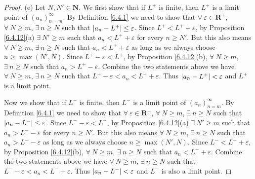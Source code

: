 \begin{proof}{(e)}
    Let \(N, N' \in \mathbf{N}\).
    We first show that if \(L^+\) is finite, then \(L^+\) is a limit point of \((a_n)_{n = m}^\infty\).
    By Definition \ref{6.4.1} we need to show that \(\forall\ \varepsilon \in \mathbf{R}^+\), \(\forall\ N \geq m\), \(\exists\ n \geq N\) such that \(\abs*{a_n - L^+} \leq \varepsilon\).
    Since \(L^+ < L^+ + \varepsilon\), by Proposition \ref{6.4.12}(a) \(\exists\ N' \geq m\) such that \(a_n < L^+ + \varepsilon\) for every \(n \geq N'\).
    But this also means \(\forall\ N \geq m\), \(\exists\ n \geq N\) such that \(a_n < L^+ + \varepsilon\) as long as we always choose \(n \geq \max(N', N)\).
    Since \(L^+ - \varepsilon < L^+\), by Proposition \ref{6.4.12}(b), \(\forall\ N \geq m\), \(\exists\ n \geq N\) such that \(a_n > L^+ - \varepsilon\).
    Combine the two statements above we have \(\forall\ N \geq m\), \(\exists\ n \geq N\) such that \(L^+ - \varepsilon < a_n < L^+ + \varepsilon\).
    Thus \(\abs*{a_n - L^+} < \varepsilon\) and \(L^+\) is a limit point.

    Now we show that if \(L^-\) is finite, then \(L^-\) is a limit point of \((a_n)_{n = m}^\infty\).
    By Definition \ref{6.4.1} we need to show that \(\forall\ \varepsilon \in \mathbf{R}^+\), \(\forall\ N \geq m\), \(\exists\ n \geq N\) such that \(\abs*{a_n - L^-} \leq \varepsilon\).
    Since \(L^- - \varepsilon < L^-\), by Proposition \ref{6.4.12}(a) \(\exists\ N' \geq m\) such that \(a_n > L^- - \varepsilon\) for every \(n \geq N'\).
    But this also means \(\forall\ N \geq m\), \(\exists\ n \geq N\) such that \(a_n > L^- - \varepsilon\) as long as we always choose \(n \geq \max(N', N)\).
    Since \(L^- < L^- + \varepsilon\), by Proposition \ref{6.4.12}(b), \(\forall\ N \geq m\), \(\exists\ n \geq N\) such that \(a_n < L^- + \varepsilon\).
    Combine the two statements above we have \(\forall\ N \geq m\), \(\exists\ n \geq N\) such that \(L^- - \varepsilon < a_n < L^- + \varepsilon\).
    Thus \(\abs*{a_n - L^-} < \varepsilon\) and \(L^-\) is also a limit point.
\end{proof}

